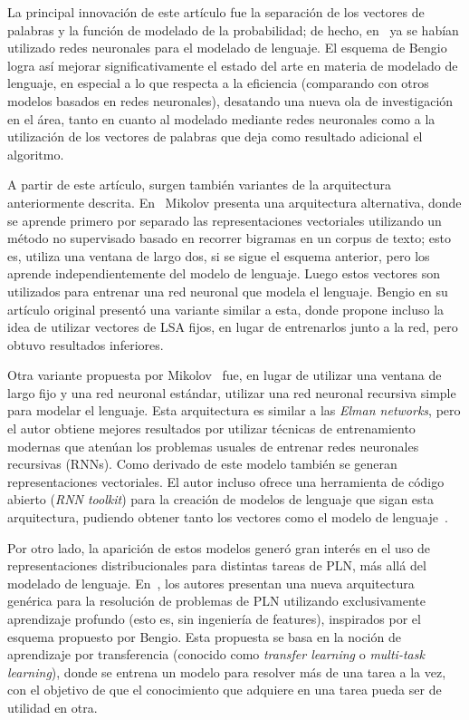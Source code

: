 La principal innovación de este artículo fue la separación de los vectores de palabras y la función
de modelado de la probabilidad; de hecho, en~\cite{MiikkulainenDyer1991} ya se habían utilizado
redes neuronales para el modelado de lenguaje. El esquema de Bengio logra así mejorar
significativamente el estado del arte en materia de modelado de lenguaje, en especial a lo que
respecta a la eficiencia (comparando con otros modelos basados en redes neuronales), desatando una
nueva ola de investigación en el área, tanto en cuanto al modelado mediante redes neuronales como a
la utilización de los vectores de palabras que deja como resultado adicional el algoritmo.


A partir de este artículo, surgen también variantes de la arquitectura anteriormente
descrita. En~\cite{Mikolov2007, Mikolov2009} Mikolov presenta una arquitectura alternativa, donde se
aprende primero por separado las representaciones vectoriales utilizando un método no supervisado
basado en recorrer bigramas en un corpus de texto; esto es, utiliza una ventana de largo dos, si se
sigue el esquema anterior, pero los aprende independientemente del modelo de lenguaje. Luego estos
vectores son utilizados para entrenar una red neuronal que modela el lenguaje. Bengio en su artículo
original presentó una variante similar a esta, donde propone incluso la idea de utilizar vectores de
LSA fijos, en lugar de entrenarlos junto a la red, pero obtuvo resultados inferiores.

Otra variante propuesta por Mikolov~\cite{Mikolov2010, Mikolov2011a, Mikolov2011b, Mikolov2011c}
fue, en lugar de utilizar una ventana de largo fijo y una red neuronal estándar, utilizar una red
neuronal recursiva simple para modelar el lenguaje. Esta arquitectura es similar a las \textit{Elman
networks}, pero el autor obtiene mejores resultados por utilizar técnicas de entrenamiento modernas
que atenúan los problemas usuales de entrenar redes neuronales recursivas (RNNs). Como derivado de
este modelo también se generan representaciones vectoriales. El autor incluso ofrece una herramienta
de código abierto (\textit{RNN toolkit}) para la creación de modelos de lenguaje que sigan esta
arquitectura, pudiendo obtener tanto los vectores como el modelo de lenguaje~\cite{Mikolov2011c}.


Por otro lado, la aparición de estos modelos generó gran interés en el uso de representaciones
distribucionales para distintas tareas de PLN, más allá del modelado de
lenguaje. En~\cite{CollobertWeston2008}, los autores presentan una nueva arquitectura genérica para
la resolución de problemas de PLN utilizando exclusivamente aprendizaje profundo (esto es, sin
ingeniería de features), inspirados por el esquema propuesto por Bengio. Esta propuesta se basa en
la noción de aprendizaje por transferencia (conocido como \textit{transfer learning} o
\textit{multi-task learning}), donde se entrena un modelo para resolver más de una tarea a la vez,
con el objetivo de que el conocimiento que adquiere en una tarea pueda ser de utilidad en otra.

